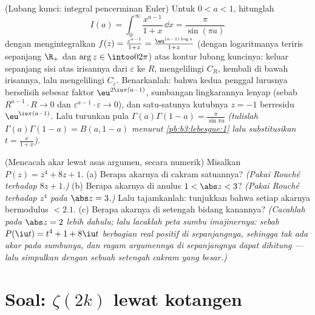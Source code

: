 \begin{exercise}[$\star\star\star$]\label{exo:b3:residues:11}
(Lubang kunci: integral pencerminan Euler) Untuk $0 < a < 1$,
hitunglah
\[
I(a) = \int_0^{\infty}\frac{x^{a-1}}{1 + x}\,\dd x =
\frac{\pi}{\sin(\pi a)}
\]
dengan mengintegralkan $f(z) = \frac{z^{a-1}}{1+z} =
\frac{\eu^{(a-1)\log z}}{1 + z}$ (dengan logaritmanya teriris sepanjang
$\R_+$ dan $\arg z \in \intoo0{2\pi}$) atas kontur lubang
kuncinya: keluar sepanjang sisi atas irisannya dari $\varepsilon$ ke
$R$, mengelilingi $C_R$, kembali di bawah irisannya, lalu mengelilingi
$C_\varepsilon$. Benarkanlah: bahwa kedua penggal lurusnya berselisih
sebesar faktor $\eu^{2\iu\pi(a-1)}$, sumbangan lingkarannya
lenyap (sebab $R^{a-1}\cdot R \to 0$ dan
$\varepsilon^{a-1}\cdot\varepsilon \to 0$), dan satu-satunya
kutubnya $z = -1$ berresidu $\eu^{\iu\pi(a - 1)}$. Lalu turunkan pula
$\Gamma(a)\Gamma(1 - a) = \frac\pi{\sin\pi a}$ \emph{(tulislah
$\Gamma(a)\Gamma(1-a) = B(a, 1-a)$ menurut
\cref{pb:b3:lebesgue:1} lalu substitusikan $t =
\frac{x}{1+x}$)}.
\end{exercise}

\begin{exercise}[$\star\star$]\label{exo:b3:residues:12}
(Mencacah akar lewat asas argumen, secara numerik)
Misalkan $P(z) = z^4 + 8z + 1$.
(a) Berapa akarnya di cakram satuannya? \emph{(Pakai Rouché terhadap
$8z + 1$.)}
(b) Berapa akarnya di anulus $1 < \abs z < 3$?
\emph{(Pakai Rouché terhadap $z^4$ pada $\abs z = 3$.)} Lalu tajamkanlah:
tunjukkan bahwa setiap akarnya bermodulus $< 2.1$.
(c) Berapa akarnya di setengah bidang kanannya? \emph{(Cacahlah pada
$\abs z = 2$ lebih dahulu; lalu lacaklah peta sumbu
imajinernya: sebab $P(\iu t) = t^4 + 1 + 8\iu t$ berbagian real positif
di sepanjangnya, sehingga tak ada akar pada sumbunya, dan
ragam argumennya di sepanjangnya dapat dihitung --- lalu simpulkan dengan sebuah
setengah cakram yang besar.)}
\end{exercise}

\section{Soal: \texorpdfstring{$\zeta(2k)$}{zeta(2k)} lewat
kotangen}

